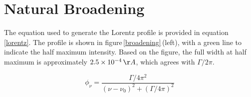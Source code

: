 \documentclass[onecolumn]{aastex6}
\begin{document}

\section{Natural Broadening}

The equation used to generate the Lorentz profile is provided in equation\,\ref{lorentz}. The profile is shown in figure\,\ref{broadening}\,(left), with a green line to indicate the half maximum intensity. Based on the figure, the full width at half maximum is approximately $2.5\times10^{-4}\,\AA$, which agrees with $\Gamma/2\pi$.

\begin{equation}
\phi_\nu = \frac{\Gamma/4\pi^2}{(\nu-\nu_0)^2 + (\Gamma/4\pi)^2}
\label{lorentz}
\end{equation}
\end{document}
